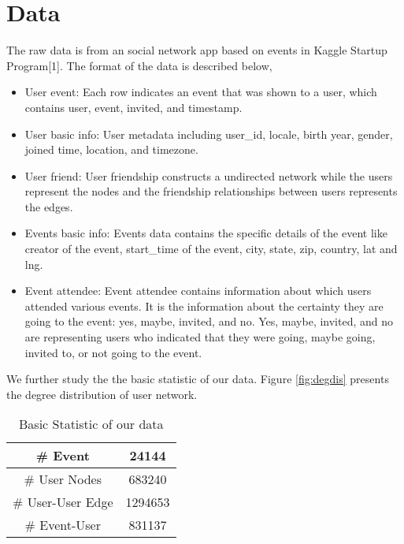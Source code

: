 \documentclass{article}
\begin{document}
\section{Data}
The raw data is from an social network app based on events in Kaggle Startup Program[1]. The format of the data is described below, 
\begin{itemize}
\item User event: Each row indicates an event that was shown to a user, which contains user, event, invited, and timestamp.

\item User basic info: User metadata including user\_id, locale, birth year, gender, joined time, location, and timezone.

\item User friend: User friendship constructs a undirected network while the users represent the nodes and the friendship relationships between users represents the edges. 


\item Events basic info: Events data contains the specific details of the event like creator of the event, start\_time of the event, city, state, zip, country, lat and lng.

\item Event attendee: Event attendee contains information about which users attended various events. It is the information about the certainty they are going to the event: yes, maybe, invited, and no. Yes, maybe, invited, and no are representing users who indicated that they were going, maybe going, invited to, or not going to the event.
\end{itemize}

We further study the the basic statistic of our data. Figure \ref{fig:degdis} presents the degree distribution of user network.

\begin{table}
\begin{center}
\caption{Basic Statistic of our data}
\begin{tabular}{|c|c|}
\hline
\# Event&24144 \\ \hline
\# User Nodes&683240\\ \hline
\# User-User Edge&1294653\\ \hline
\# Event-User&831137\\ \hline
\end{tabular}
\end{center}

\end{table}
\end{document}

